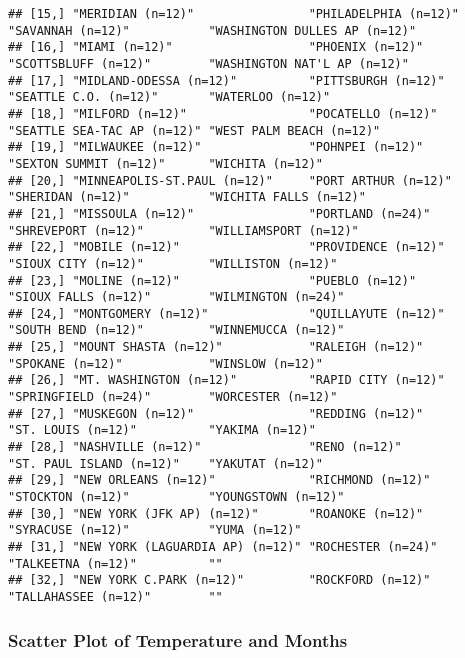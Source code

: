 \documentclass[
]{book}
\begin{document}
\begin{verbatim}
## [15,] "MERIDIAN (n=12)"                "PHILADELPHIA (n=12)"      "SAVANNAH (n=12)"           "WASHINGTON DULLES AP (n=12)"
## [16,] "MIAMI (n=12)"                   "PHOENIX (n=12)"           "SCOTTSBLUFF (n=12)"        "WASHINGTON NAT'L AP (n=12)" 
## [17,] "MIDLAND-ODESSA (n=12)"          "PITTSBURGH (n=12)"        "SEATTLE C.O. (n=12)"       "WATERLOO (n=12)"            
## [18,] "MILFORD (n=12)"                 "POCATELLO (n=12)"         "SEATTLE SEA-TAC AP (n=12)" "WEST PALM BEACH (n=12)"     
## [19,] "MILWAUKEE (n=12)"               "POHNPEI (n=12)"           "SEXTON SUMMIT (n=12)"      "WICHITA (n=12)"             
## [20,] "MINNEAPOLIS-ST.PAUL (n=12)"     "PORT ARTHUR (n=12)"       "SHERIDAN (n=12)"           "WICHITA FALLS (n=12)"       
## [21,] "MISSOULA (n=12)"                "PORTLAND (n=24)"          "SHREVEPORT (n=12)"         "WILLIAMSPORT (n=12)"        
## [22,] "MOBILE (n=12)"                  "PROVIDENCE (n=12)"        "SIOUX CITY (n=12)"         "WILLISTON (n=12)"           
## [23,] "MOLINE (n=12)"                  "PUEBLO (n=12)"            "SIOUX FALLS (n=12)"        "WILMINGTON (n=24)"          
## [24,] "MONTGOMERY (n=12)"              "QUILLAYUTE (n=12)"        "SOUTH BEND (n=12)"         "WINNEMUCCA (n=12)"          
## [25,] "MOUNT SHASTA (n=12)"            "RALEIGH (n=12)"           "SPOKANE (n=12)"            "WINSLOW (n=12)"             
## [26,] "MT. WASHINGTON (n=12)"          "RAPID CITY (n=12)"        "SPRINGFIELD (n=24)"        "WORCESTER (n=12)"           
## [27,] "MUSKEGON (n=12)"                "REDDING (n=12)"           "ST. LOUIS (n=12)"          "YAKIMA (n=12)"              
## [28,] "NASHVILLE (n=12)"               "RENO (n=12)"              "ST. PAUL ISLAND (n=12)"    "YAKUTAT (n=12)"             
## [29,] "NEW ORLEANS (n=12)"             "RICHMOND (n=12)"          "STOCKTON (n=12)"           "YOUNGSTOWN (n=12)"          
## [30,] "NEW YORK (JFK AP) (n=12)"       "ROANOKE (n=12)"           "SYRACUSE (n=12)"           "YUMA (n=12)"                
## [31,] "NEW YORK (LAGUARDIA AP) (n=12)" "ROCHESTER (n=24)"         "TALKEETNA (n=12)"          ""                           
## [32,] "NEW YORK C.PARK (n=12)"         "ROCKFORD (n=12)"          "TALLAHASSEE (n=12)"        ""
\end{verbatim}

\hypertarget{scatter-plot-of-temperature-and-months}{%
\subsubsection{Scatter Plot of Temperature and Months}\label{scatter-plot-of-temperature-and-months}}
\end{document}
